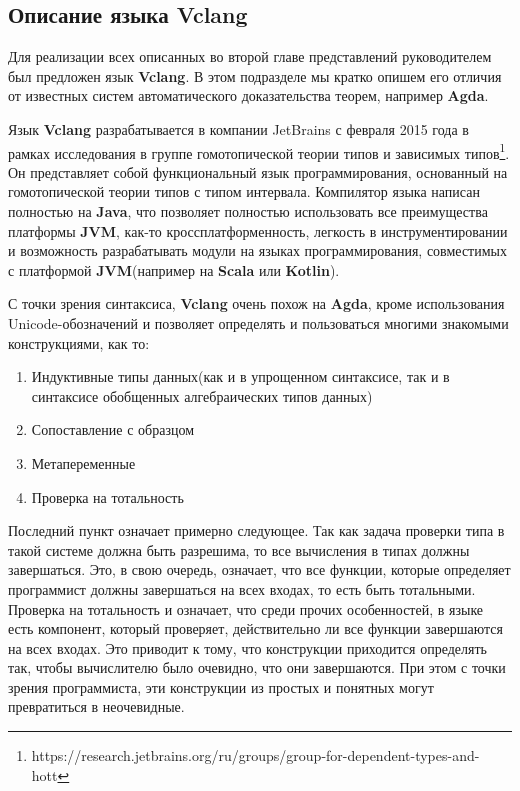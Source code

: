 \subsection{Описание языка Vclang}

Для реализации всех описанных во второй главе представлений руководителем был предложен язык \textbf{Vclang}. В этом подразделе мы кратко опишем его отличия от известных систем автоматического доказательства теорем, например \textbf{Agda}.

Язык \textbf{Vclang} разрабатывается в компании JetBrains с февраля 2015 года в рамках исследования в группе гомотопической теории типов и зависимых типов\footnote{https://research.jetbrains.org/ru/groups/group-for-dependent-types-and-hott}. Он представляет собой функциональный язык программирования, основанный на гомотопической теории типов с типом интервала. Компилятор языка написан полностью на \textbf{Java}, что позволяет полностью использовать все преимущества платформы \textbf{JVM}, как-то кроссплатформенность, легкость в инструментировании и возможность разрабатывать модули на языках программирования, совместимых с платформой \textbf{JVM}(например на \textbf{Scala} или \textbf{Kotlin}).

С точки зрения синтаксиса, \textbf{Vclang} очень похож на \textbf{Agda}, кроме использования Unicode-обозначений и позволяет определять и пользоваться многими знакомыми конструкциями, как то:
\begin{enumerate}
  \item Индуктивные типы данных(как и в упрощенном синтаксисе, так и в синтаксисе обобщенных алгебраических типов данных)
  \item Сопоставление с образцом
  \item Метапеременные
  \item Проверка на тотальность
\end{enumerate}

Последний пункт означает примерно следующее. Так как задача проверки типа в такой системе должна быть разрешима, то все вычисления в типах должны завершаться. Это, в свою очередь, означает, что все функции, которые определяет программист должны завершаться на всех входах, то есть быть тотальными. Проверка на тотальность и означает, что среди прочих особенностей, в языке есть компонент, который проверяет, действительно ли все функции завершаются на всех входах. Это приводит к тому, что конструкции приходится определять так, чтобы вычислителю было очевидно, что они завершаются. При этом с точки зрения программиста, эти конструкции из простых и понятных могут превратиться в неочевидные.

